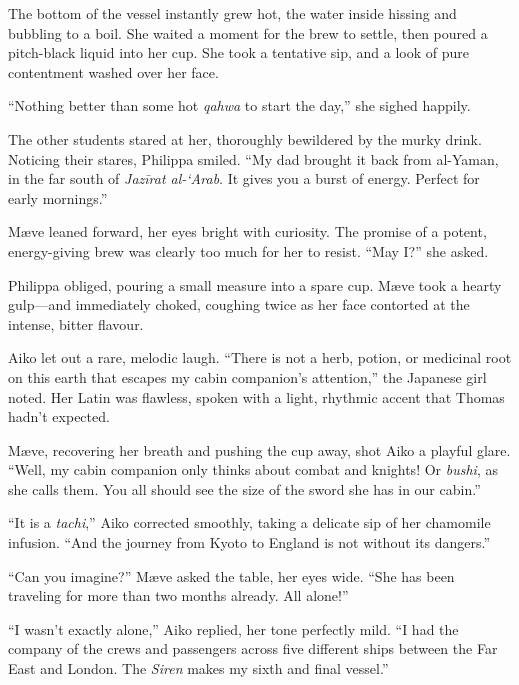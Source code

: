 The bottom of the vessel instantly grew hot, the water inside hissing and bubbling to a boil. She waited a moment for the brew to settle, then poured a pitch-black liquid into her cup. She took a tentative sip, and a look of pure contentment washed over her face.

\enquote{Nothing better than some hot \textit{qahwa} to start the day,} she sighed happily.

The other students stared at her, thoroughly bewildered by the murky drink. Noticing their stares, Philippa smiled. \enquote{My dad brought it back from al-Yaman, in the far south of \textit{Jazīrat al-\textquoteleft{}Arab}. It gives you a burst of energy. Perfect for early mornings.}

Mæve leaned forward, her eyes bright with curiosity. The promise of a potent, energy-giving brew was clearly too much for her to resist. \enquote{May I?} she asked.

Philippa obliged, pouring a small measure into a spare cup. Mæve took a hearty gulp---and immediately choked, coughing twice as her face contorted at the intense, bitter flavour.

Aiko let out a rare, melodic laugh. \enquote{There is not a herb, potion, or medicinal root on this earth that escapes my cabin companion's attention,} the Japanese girl noted. Her Latin was flawless, spoken with a light, rhythmic accent that Thomas hadn't expected.

Mæve, recovering her breath and pushing the cup away, shot Aiko a playful glare. \enquote{Well, my cabin companion only thinks about combat and knights! Or \textit{bushi}, as she calls them. You all should see the size of the sword she has in our cabin.}

\enquote{It is a \textit{tachi},} Aiko corrected smoothly, taking a delicate sip of her chamomile infusion. \enquote{And the journey from Kyoto to England is not without its dangers.}

\enquote{Can you imagine?} Mæve asked the table, her eyes wide. \enquote{She has been traveling for more than two months already. All alone!}

\enquote{I wasn't exactly alone,} Aiko replied, her tone perfectly mild. \enquote{I had the company of the crews and passengers across five different ships between the Far East and London. The \textit{Siren} makes my sixth and final vessel.}

